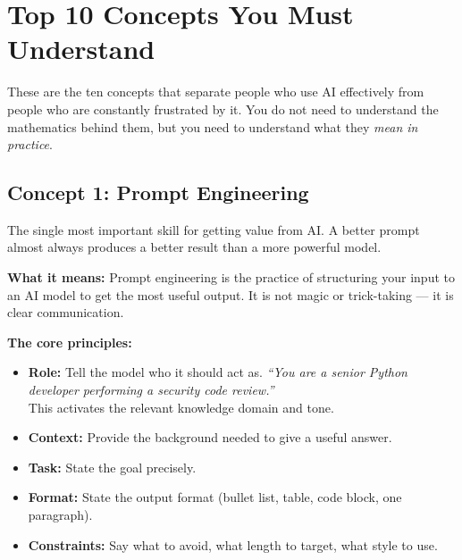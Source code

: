 \chapter{Top 10 Concepts You Must Understand}
\label{ch:concepts}

These are the ten concepts that separate people who use AI effectively from people who
are constantly frustrated by it.
You do not need to understand the mathematics behind them, but you need to understand
what they \emph{mean in practice}.

\section{Concept 1: Prompt Engineering}
\label{sec:prompt-engineering}

\begin{conceptbox}
The single most important skill for getting value from AI.
A better prompt almost always produces a better result than a more powerful model.
\end{conceptbox}

\textbf{What it means:} Prompt engineering is the practice of structuring your input to
an AI model to get the most useful output.
It is not magic or trick-taking --- it is clear communication.

\textbf{The core principles:}
\begin{itemize}
  \item \textbf{Role:} Tell the model who it should act as.
    \textit{``You are a senior Python developer performing a security code review.''} \\
    This activates the relevant knowledge domain and tone.
  \item \textbf{Context:} Provide the background needed to give a useful answer.
  \item \textbf{Task:} State the goal precisely.
  \item \textbf{Format:} State the output format (bullet list, table, code block,
    one paragraph).
  \item \textbf{Constraints:} Say what to avoid, what length to target, what style
    to use.
\end{itemize}

